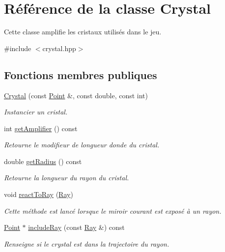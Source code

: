 \hypertarget{classCrystal}{}\section{Référence de la classe Crystal}
\label{classCrystal}


Cette classe amplifie les cristaux utilisés dans le jeu.  




{\ttfamily \#include $<$crystal.\+hpp$>$}

\subsection*{Fonctions membres publiques}
\begin{DoxyCompactItemize}
\item 
\hyperlink{classCrystal_ace23d553475cfcd48496d8c2dc1ae656}{Crystal} (const \hyperlink{classPoint}{Point} \&, const double, const int)
\begin{DoxyCompactList}\small\item\em Instancier un cristal. \end{DoxyCompactList}\item 
int \hyperlink{classCrystal_a231a9965f3c0651a7c0776b12e8acd37}{get\+Amplifier} () const 
\begin{DoxyCompactList}\small\item\em Retourne le modifieur de longueur d\textquotesingle{}onde du cristal. \end{DoxyCompactList}\item 
double \hyperlink{classCrystal_a455b55c1fc7c1083a8c4dd437584ccfb}{get\+Radius} () const 
\begin{DoxyCompactList}\small\item\em Retourne la longueur du rayon du cristal. \end{DoxyCompactList}\item 
void \hyperlink{classCrystal_a4f9351f0556cf2e9334d7976bff48830}{react\+To\+Ray} (\hyperlink{classRay}{Ray})
\begin{DoxyCompactList}\small\item\em Cette méthode est lancé lorsque le miroir courant est exposé à un rayon. \end{DoxyCompactList}\item 
\hyperlink{classPoint}{Point} $\ast$ \hyperlink{classCrystal_a97212bbcd6c34f243ac8f18b6641e639}{include\+Ray} (const \hyperlink{classRay}{Ray} \&) const 
\begin{DoxyCompactList}\small\item\em Renseigne si le crystal est dans la trajectoire du rayon. \end{DoxyCompactList}\item 

\end{DoxyCompactItemize}
